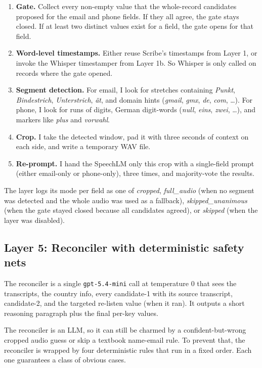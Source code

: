 \documentclass[11pt,a4paper]{article}
\begin{document}
\begin{enumerate}
\item \textbf{Gate.} Collect every non-empty value that the
whole-record candidates proposed for the email and phone fields. If
they all agree, the gate stays closed. If at least two distinct
values exist for a field, the gate opens for that field.
\item \textbf{Word-level timestamps.} Either reuse Scribe's
timestamps from Layer 1, or invoke the Whisper timestamper from
Layer 1b. So Whisper is only called on records where the gate
opened.
\item \textbf{Segment detection.} For email, I look for stretches
containing \textit{Punkt}, \textit{Bindestrich},
\textit{Unterstrich}, \textit{\"at}, and domain hints
(\textit{gmail}, \textit{gmx}, \textit{de}, \textit{com}, \dots).
For phone, I look for runs of digits, German digit-words
(\textit{null}, \textit{eins}, \textit{zwei}, \dots), and markers
like \textit{plus} and \textit{vorwahl}.
\item \textbf{Crop.} I take the detected window, pad it with three
seconds of context on each side, and write a temporary WAV file.
\item \textbf{Re-prompt.} I hand the SpeechLM only this crop with a
single-field prompt (either email-only or phone-only), three times,
and majority-vote the results.
\end{enumerate}

The layer logs its mode per field as one of
\textit{cropped}, \textit{full\_audio} (when no segment was detected
and the whole audio was used as a fallback), \textit{skipped\_unanimous}
(when the gate stayed closed because all candidates agreed), or
\textit{skipped} (when the layer was disabled).

\subsection{Layer 5: Reconciler with deterministic safety nets}\label{sec:m_l5}

The reconciler is a single \verb|gpt-5.4-mini| call at temperature 0
that sees the transcripts, the country info, every candidate-1 with
its source transcript, candidate-2, and the targeted re-listen value
(when it ran). It outputs a short reasoning paragraph plus the final
per-key values.

The reconciler is an LLM, so it can still be charmed by a
confident-but-wrong cropped audio guess or skip a textbook
name-email rule. To prevent that, the reconciler is wrapped by four
deterministic rules that run in a fixed order. Each one guarantees a
class of obvious cases.
\end{document}
